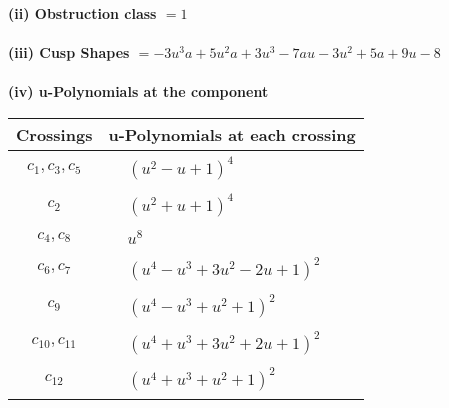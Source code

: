 \documentclass[1p]{elsarticle_modified}
\theoremstyle{definition}
\begin{document}
\flushleft \textbf{(ii) Obstruction class $= 1$}\\~\\
\flushleft \textbf{(iii) Cusp Shapes $= -3 u^3 a+5 u^2 a+3 u^3-7 a u-3 u^2+5 a+9 u-8$}\\~\\
\newpage\renewcommand{\arraystretch}{1}
\flushleft \textbf{(iv) u-Polynomials at the component}\newline \\
\begin{tabular}{m{50pt}|m{274pt}}
Crossings & \hspace{64pt}u-Polynomials at each crossing \\
\hline $$\begin{aligned}c_{1},c_{3},c_{5}\end{aligned}$$&$\begin{aligned}
&(u^2- u+1)^4
\end{aligned}$\\
\hline $$\begin{aligned}c_{2}\end{aligned}$$&$\begin{aligned}
&(u^2+u+1)^4
\end{aligned}$\\
\hline $$\begin{aligned}c_{4},c_{8}\end{aligned}$$&$\begin{aligned}
&u^8
\end{aligned}$\\
\hline $$\begin{aligned}c_{6},c_{7}\end{aligned}$$&$\begin{aligned}
&(u^4- u^3+3 u^2-2 u+1)^2
\end{aligned}$\\
\hline $$\begin{aligned}c_{9}\end{aligned}$$&$\begin{aligned}
&(u^4- u^3+u^2+1)^2
\end{aligned}$\\
\hline $$\begin{aligned}c_{10},c_{11}\end{aligned}$$&$\begin{aligned}
&(u^4+u^3+3 u^2+2 u+1)^2
\end{aligned}$\\
\hline $$\begin{aligned}c_{12}\end{aligned}$$&$\begin{aligned}
&(u^4+u^3+u^2+1)^2
\end{aligned}$\\
\hline
\end{tabular}\\~\\
\end{document}
